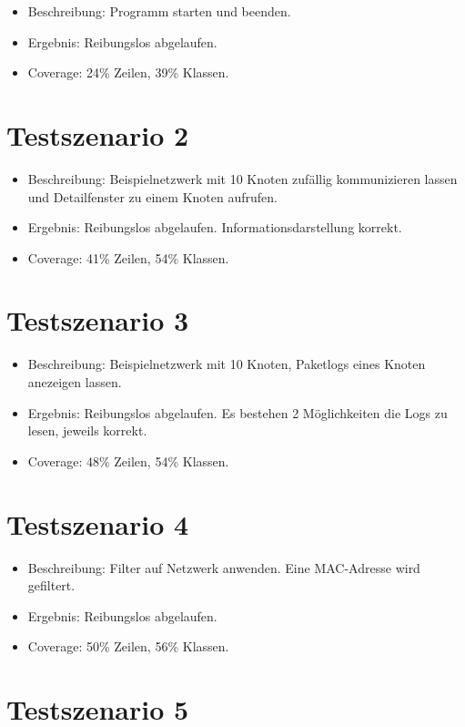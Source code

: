 \begin{itemize}
  \item Beschreibung: Programm starten und beenden.
  \item Ergebnis: Reibungslos abgelaufen.
  \item Coverage: 24\% Zeilen, 39\% Klassen.
\end{itemize}

\section{Testszenario 2}

\begin{itemize}
  \item Beschreibung: Beispielnetzwerk mit 10 Knoten zufällig kommunizieren lassen und Detailfenster zu einem Knoten aufrufen.
  \item Ergebnis: Reibungslos abgelaufen. Informationsdarstellung korrekt.
  \item Coverage: 41\% Zeilen, 54\% Klassen.
\end{itemize}

\section{Testszenario 3}

\begin{itemize}
  \item Beschreibung: Beispielnetzwerk mit 10 Knoten, Paketlogs eines Knoten anezeigen lassen.
  \item Ergebnis: Reibungslos abgelaufen. Es bestehen 2 Möglichkeiten die Logs zu lesen, jeweils korrekt.
  \item Coverage: 48\% Zeilen, 54\% Klassen.
\end{itemize} 

\section{Testszenario 4}

\begin{itemize}
  \item Beschreibung: Filter auf Netzwerk anwenden. Eine MAC-Adresse wird gefiltert.
  \item Ergebnis: Reibungslos abgelaufen.
  \item Coverage: 50\% Zeilen, 56\% Klassen.
\end{itemize}

\section{Testszenario 5}

